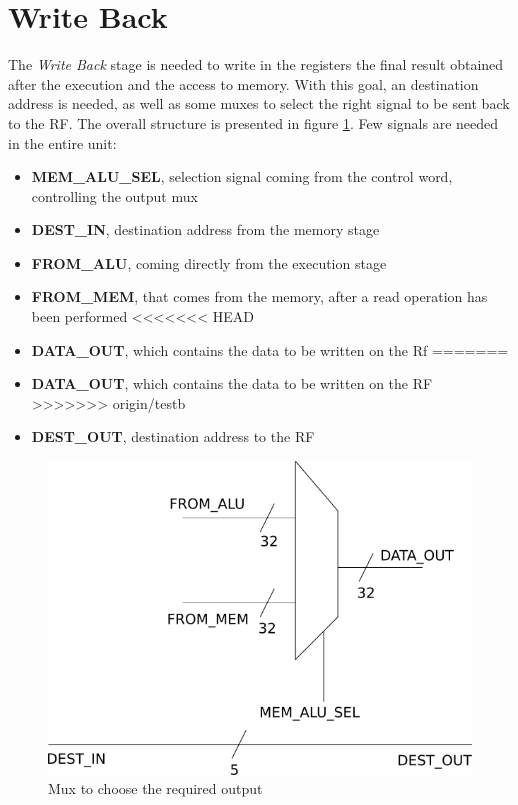 \section{Write Back}
\label{chap_wb}


The \textit{Write Back} stage is needed to write in the registers the final result obtained after the execution and the access to memory. With this goal, an destination address is needed, as well as some muxes to select the right signal to be sent back to the \textsf{RF}. The overall structure is presented in figure \ref{wb_overall_fig}.
Few signals are needed in the entire unit:
\begin{itemize}
	\item \textbf{MEM\_ALU\_SEL}, selection signal coming from the control word, controlling the output mux
	\item \textbf{DEST\_IN}, destination address from the memory stage
	\item \textbf{FROM\_ALU}, coming directly from the execution stage
	\item \textbf{FROM\_MEM}, that comes from the memory, after a read operation has been performed
<<<<<<< HEAD
	\item \textbf{DATA\_OUT}, which contains the data to be written on the \textsf{Rf}
=======
	\item \textbf{DATA\_OUT}, which contains the data to be written on the 
	\textsf{RF}
>>>>>>> origin/testb
	\item \textbf{DEST\_OUT}, destination address to the \textsf{RF}
\end{itemize}

\begin{figure}
	\centering
	\includegraphics[scale=0.5]{chapters/figures/wb_stage}
	\caption{Mux to choose the required output}
	\label{wb_overall_fig}
\end{figure} 


